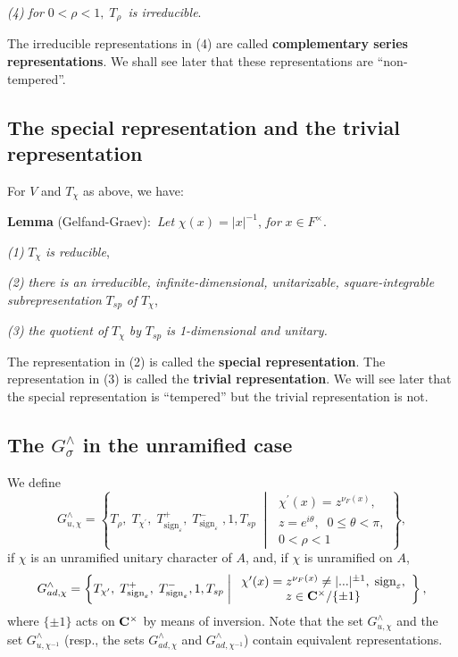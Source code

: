 \documentclass[11pt, a4paper]{article}
\begin{document}
{\em (4) for }$0<\rho <1,\;T_\rho ${\em \ is irreducible}.

The irreducible representations in (4) are called {\bf complementary series
representations}. We shall see later that these representations are
``non-tempered''.

\subsection{The special representation and the trivial representation}

For $V$ and $T_\chi $ as above, we have:

{\bf Lemma} (Gelfand-Graev):{\em \ Let }$\chi (x)=|x|^{-1}$, {\em for} $x\in
F^{\times }$.

{\em (1)} $T_\chi $ {\em is reducible},

{\em (2) there is an irreducible, infinite-dimensional, unitarizable,
square-integrable subrepresentation} $T_{sp}$ {\em of} $T_\chi $,

{\em (3) the quotient of} $T_\chi $ {\em by} $T_{sp}$ {\em is 1-dimensional and unitary.}

The representation in (2) is called the {\bf special representation}. The
representation in (3) is called the {\bf trivial representation}. We will
see later that the special representation is ``tempered'' but the trivial
representation is not.

\subsection{The $G_\sigma ^{\wedge }$ in the unramified case}

We define
\[
G_{u,\chi }^{\wedge }=\left\{T_\rho ,\;T_{\chi ^{\prime }},\;T_{\mathrm{sign}_\varepsilon
}^{+},\;T_{\mathrm{sign}_\varepsilon }^{-}\;,1,T_{sp}\;\middle|\; 
\begin{array}{c}
\chi ^{\prime }(x)=z^{\nu _F(x)},\; \\ 
z=e^{i\theta },\;\;0\leq \theta <\pi , \\ 
0<\rho <1
\end{array}
\right\},
\]
if $\chi $ is an unramified unitary character of $A$, and, if $\chi $ is
unramified on $A$,
\[
G_{ad,\chi }^{\wedge }=\left\{T_{\chi ^{\prime }},\;T_{\mathrm{sign}_\varepsilon
}^{+},\;T_{\mathrm{sign}_\varepsilon }^{-},1,T_{sp}\;\middle|\; 
\begin{array}{c}
\chi ^{\prime }(x)=z^{\nu _F(x)}\neq |...|^{\pm 1},\;\mathrm{sign}_\varepsilon , \\ 
z\in {\bf C}^{\times }/\{\pm 1\}
\end{array}
\right\},
\]
where $\{\pm 1\}$ acts on ${\bf C}^{\times }$ by means of inversion. Note
that the set $G_{u,\chi }^{\wedge }$ and the set $G_{u,\chi ^{-1}}^{\wedge }$
(resp., the sets $G_{ad,\chi }^{\wedge }$ and $G_{ad,\chi ^{-1}}^{\wedge }$)
contain equivalent representations.
\end{document}
